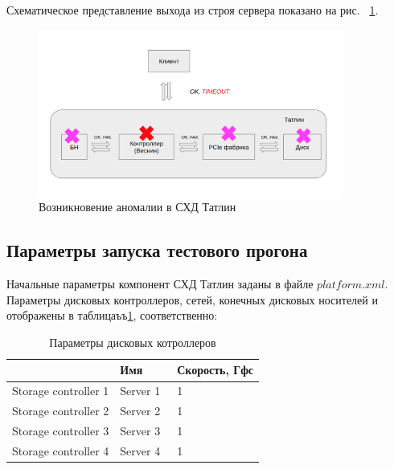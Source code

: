 Схематическое представление выхода из строя сервера показано на рис. ~\ref{fig:bad-tatlin}.

\begin{figure}[!ht]
\centering
\includegraphics[width=10cm]{Kenenbek/images/bad.png}
\caption{Возникновение аномалии в СХД Татлин}
\label{fig:bad-tatlin}
\end{figure}

\subsection{Параметры запуска тестового прогона}

Начальные параметры компонент СХД Татлин заданы в файле $platform.xml$. Параметры дисковых контроллеров, сетей, конечных дисковых носителей и отображены в таблицаъъ\ref{tab:storage-contollers}, соответственно:

\begin{table}[]
\centering
\caption{Параметры дисковых котроллеров}
\label{tab:storage-contollers}
\begin{tabularx}{\textwidth}{|l|l|l|} 
\hline
                     & Имя       & Скорость, Гфс  \\ 
\hline
Storage controller 1 & Server 1~ & 1              \\ 
\hline
Storage controller 2 & Server 2~ & 1              \\ 
\hline
Storage controller 3 & Server 3~ & 1              \\ 
\hline
Storage controller 4 & Server 4~ & 1              \\
\hline
\end{tabularx}
\end{table}


